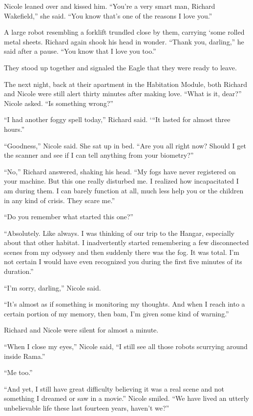 \documentclass[]{article}
\begin{document}
{Nicole leaned over and kissed him. “You’re a very smart man, Richard Wakefield,” she said. “You know that’s one of the reasons I love you.”

A large robot resembling a forklift trundled close by them, carrying ‘some rolled metal sheets. Richard again shook his head in wonder. “Thank you, darling,” he said after a pause. “You know that I love you too.”

They stood up together and signaled the Eagle that they were ready to leave.

The next night, back at their apartment in the Habitation Module, both Richard and Nicole were still alert thirty minutes after making love. “What is it, dear?” Nicole asked. “Is something wrong?”

“I had another foggy spell today,” Richard said. ‘“It lasted for almost three hours.”

“Goodness,” Nicole said. She sat up in bed. “Are you all right now? Should I get the scanner and see if I can tell anything from your biometry?”

“No,” Richard answered, shaking his head. “My fogs have never registered on your machine. But this one really disturbed me. I realized how incapacitated I am during them. I can barely function at all, much less help you or the children in any kind of crisis. They scare me.”

“Do you remember what started this one?”

“Absolutely. Like always. I was thinking of our trip to the Hangar, especially about that other habitat. I inadvertently started remembering a few disconnected scenes from my odyssey and then suddenly there was the fog. It was total. I’m not certain I would have even recognized you during the first five minutes of its duration.”

“I’m sorry, darling,” Nicole said.

“It’s almost as if something is monitoring my thoughts. And when I reach into a certain portion of my memory, then bam, I’m given some kind of warning.”

Richard and Nicole were silent for almost a minute.

“When I close my eyes,” Nicole said, “I still see all those robots scurrying around inside Rama.”

“Me too.”

“And yet, I still have great difficulty believing it was a real scene and not something I dreamed or saw in a movie.” Nicole smiled. “We have lived an utterly unbelievable life these last fourteen years, haven’t we?”

}
\end{document}
